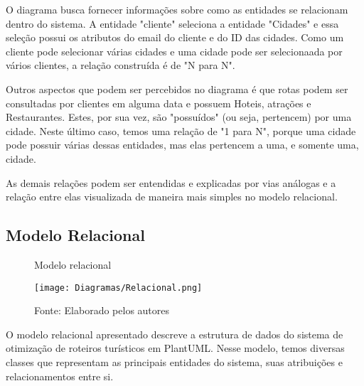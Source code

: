 O diagrama busca fornecer informações sobre como as entidades se relacionam dentro do sistema. A entidade "cliente" seleciona a entidade "Cidades" e essa seleção possui os atributos do email do cliente e do ID das cidades. Como um cliente pode selecionar várias cidades e uma cidade pode ser selecionaada por vários clientes, a relação construída é de "N para N". 

Outros aspectos que podem ser percebidos no diagrama é que rotas podem ser consultadas por clientes em alguma data e possuem Hoteis, atrações e Restaurantes. Estes, por sua vez, são "possuídos" (ou seja, pertencem) por uma cidade. Neste último caso, temos uma relação de "1 para N", porque uma cidade pode possuir várias dessas entidades, mas elas pertencem a uma, e somente uma, cidade. 

As demais relações podem ser entendidas e explicadas por vias análogas e a relação entre elas visualizada de maneira mais simples no modelo relacional. 



\subsection{Modelo Relacional}


\begin{figure}[H]
    \centering
    \caption{Modelo relacional}
    \label{fig:DER}
    \texttt{[image: Diagramas/Relacional.png]}\\
    \caption*{Fonte: Elaborado pelos autores}
\end{figure}

O modelo relacional apresentado descreve a estrutura de dados do sistema de otimização de roteiros turísticos em PlantUML. Nesse modelo, temos diversas classes que representam as principais entidades do sistema, suas atribuições e relacionamentos entre si.

